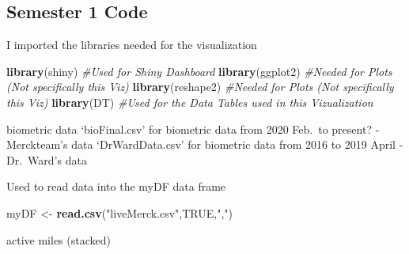 \documentclass[]{book}
\newenvironment{Shaded}{\begin{snugshade}}{\end{snugshade}}
\newcommand{\CommentTok}[1]{\textcolor[rgb]{0.56,0.35,0.01}{\textit{#1}}}
\newcommand{\DataTypeTok}[1]{\textcolor[rgb]{0.13,0.29,0.53}{#1}}
\newcommand{\KeywordTok}[1]{\textcolor[rgb]{0.13,0.29,0.53}{\textbf{#1}}}
\newcommand{\NormalTok}[1]{#1}
\newcommand{\OperatorTok}[1]{\textcolor[rgb]{0.81,0.36,0.00}{\textbf{#1}}}
\newcommand{\OtherTok}[1]{\textcolor[rgb]{0.56,0.35,0.01}{#1}}
\newcommand{\StringTok}[1]{\textcolor[rgb]{0.31,0.60,0.02}{#1}}
\begin{document}
\hypertarget{semester-1-code}{%
\subsection{Semester 1 Code}\label{semester-1-code}}

I imported the libraries needed for the visualization

\begin{Shaded}
\begin{Highlighting}[]
\KeywordTok{library}\NormalTok{(shiny) }\CommentTok{#Used for Shiny Dashboard}
\KeywordTok{library}\NormalTok{(ggplot2) }\CommentTok{#Needed for Plots (Not specifically this Viz)}
\KeywordTok{library}\NormalTok{(reshape2) }\CommentTok{#Needed for Plots (Not specifically this Viz)}
\KeywordTok{library}\NormalTok{(DT) }\CommentTok{#Used for the Data Tables used in this Vizualization}
\end{Highlighting}
\end{Shaded}

biometric data
`bioFinal.csv' for biometric data from 2020 Feb.~to present? - Merckteam's data
`DrWardData.csv' for biometric data from 2016 to 2019 April - Dr.~Ward's data

Used to read data into the myDF data frame

\begin{Shaded}
\begin{Highlighting}[]
\NormalTok{myDF <-}\StringTok{ }\KeywordTok{read.csv}\NormalTok{(}\StringTok{"liveMerck.csv"}\NormalTok{,}\OtherTok{TRUE}\NormalTok{,}\StringTok{","}\NormalTok{)}
\end{Highlighting}
\end{Shaded}

active miles (stacked)

\begin{Shaded}
\end{Shaded}
\end{document}

